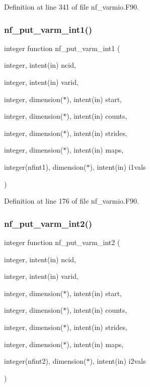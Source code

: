 Definition at line 341 of file nf\+\_\+varmio.\+F90.

\mbox{\label{nf__varmio_8F90_aab4f5152f37a73f4c773af1216e4369f}} 
\subsubsection{\texorpdfstring{nf\+\_\+put\+\_\+varm\+\_\+int1()}{nf\_put\_varm\_int1()}}
{\footnotesize\ttfamily integer function nf\+\_\+put\+\_\+varm\+\_\+int1 (\begin{DoxyParamCaption}\item[{integer, intent(in)}]{ncid,  }\item[{integer, intent(in)}]{varid,  }\item[{integer, dimension($\ast$), intent(in)}]{start,  }\item[{integer, dimension($\ast$), intent(in)}]{counts,  }\item[{integer, dimension($\ast$), intent(in)}]{strides,  }\item[{integer, dimension($\ast$), intent(in)}]{maps,  }\item[{integer(nfint1), dimension($\ast$), intent(in)}]{i1vals }\end{DoxyParamCaption})}



Definition at line 176 of file nf\+\_\+varmio.\+F90.

\mbox{\label{nf__varmio_8F90_a4b84d7c24776e7b1749a952b083569e0}} 
\subsubsection{\texorpdfstring{nf\+\_\+put\+\_\+varm\+\_\+int2()}{nf\_put\_varm\_int2()}}
{\footnotesize\ttfamily integer function nf\+\_\+put\+\_\+varm\+\_\+int2 (\begin{DoxyParamCaption}\item[{integer, intent(in)}]{ncid,  }\item[{integer, intent(in)}]{varid,  }\item[{integer, dimension($\ast$), intent(in)}]{start,  }\item[{integer, dimension($\ast$), intent(in)}]{counts,  }\item[{integer, dimension($\ast$), intent(in)}]{strides,  }\item[{integer, dimension($\ast$), intent(in)}]{maps,  }\item[{integer(nfint2), dimension($\ast$), intent(in)}]{i2vals }\end{DoxyParamCaption})}



